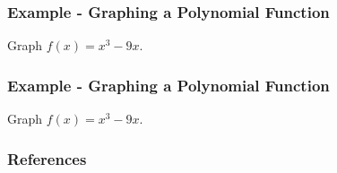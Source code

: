 \documentclass{beamer}
\begin{document}
\begin{frame}
    \frametitle{Example - Graphing a Polynomial Function}

    Graph \(f(x) = x^3 - 9x\). 

\end{frame}

\begin{frame}
    \frametitle{Example - Graphing a Polynomial Function}

    Graph \(f(x)= x^3 -9x\). 

\end{frame}

\begin{frame}
    \frametitle{References}
\end{frame}
\end{document}
